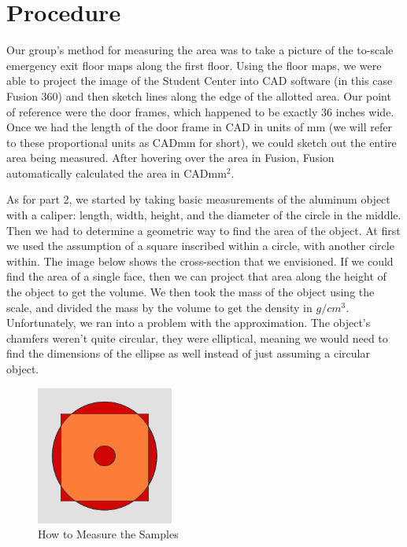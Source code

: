 \documentclass{article}
\begin{document}
\section{Procedure}

Our group’s method for measuring the area was to take a picture of the to-scale emergency exit floor maps along the first floor. Using the floor maps, we were able to project the image of the Student Center into CAD software (in this case Fusion 360) and then sketch lines along the edge of the allotted area.  Our point of reference were the door frames, which happened to be exactly 36 inches wide. Once we had the length of the door frame in CAD in units of mm (we will refer to these proportional units as CADmm for short), we could sketch out the entire area being measured. After hovering over the area in Fusion, Fusion automatically calculated the area in CADmm$^2$.

As for part 2, we started by taking basic measurements of the aluminum object with a caliper: length, width, height, and the diameter of the circle in the middle. Then we had to determine a geometric way to find the area of the object. At first we used the assumption of a square inscribed within a circle, with another circle within. The image below shows the cross-section that we envisioned. If we could find the area of a single face, then we can project that area along the height of the object to get the volume. We then took the mass of the object using the scale, and divided the mass by the volume to get the density in \(g/cm^3\). Unfortunately, we ran into a problem with the approximation. The object's chamfers weren't quite circular, they were elliptical, meaning we would need to find the dimensions of the ellipse as well instead of just assuming a circular object.

\begin{figure}[htbp]
  \centering
  \includegraphics[width=0.4\textwidth]{Crosssection1.png}
  \caption{How to Measure the Samples}
  \end{figure} \FloatBarrier
\end{document}
